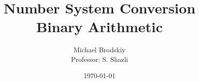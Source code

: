 


\pagestyle{fancy}

\title{Number System Conversion\\Binary Arithmetic}
\date{\today}
\author{Michael Brodskiy\\ \small Professor: S. Shazli}



\maketitle

\thispagestyle{fancy}

